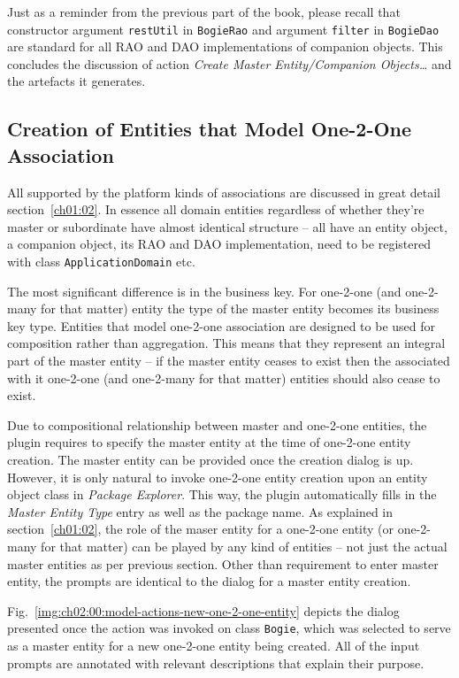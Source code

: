   Just as a reminder from the previous part of the book, please recall that constructor argument \texttt{restUtil} in \texttt{BogieRao} and argument \texttt{filter} in \texttt{BogieDao} are standard for all RAO and DAO implementations of companion objects.
  This concludes the discussion of action \emph{Create Master Entity/Companion Objects\ldots} and the artefacts it generates.
 

  \subsection{Creation of Entities that Model One-2-One Association}  
 
  All supported by the platform kinds of associations are discussed in great detail section~\ref{ch01:02}.
  In essence all domain entities regardless of whether they're master or subordinate have almost identical structure -- all have an entity object, a companion object, its RAO and DAO implementation, need to be registered with class \texttt{ApplicationDomain} etc.
  
  The most significant difference is in the business key.  
  For one-2-one (and one-2-many for that matter) entity the type of the master entity becomes its business key type.
  Entities that model one-2-one association are designed to be used for composition rather than aggregation.
  This means that they represent an integral part of the master entity -- if the master entity ceases to exist then the associated with it one-2-one (and one-2-many for that matter) entities should also cease to exist.
  
  Due to compositional relationship between master and one-2-one entities, the plugin requires to specify the master entity at the time of one-2-one entity creation.
  The master entity can be provided once the creation dialog is up.
  However, it is only natural to invoke one-2-one entity creation upon an entity object class in \emph{Package Explorer}.
  This way, the plugin automatically fills in the \emph{Master Entity Type} entry as well as the package name.
  As explained in section~\ref{ch01:02}, the role of the maser entity for a one-2-one entity (or one-2-many for that matter) can be played by any kind of entities -- not just the actual master entities as per previous section.
  Other than requirement to enter master entity, the prompts are identical to the dialog for a master entity creation.
  
  Fig.~\ref{img:ch02:00:model-actions-new-one-2-one-entity} depicts the dialog presented once the action was invoked on class \texttt{Bogie}, which was selected to serve as a master entity for a new one-2-one entity being created.
  All of the input prompts are annotated with relevant descriptions that explain their purpose.  
 
